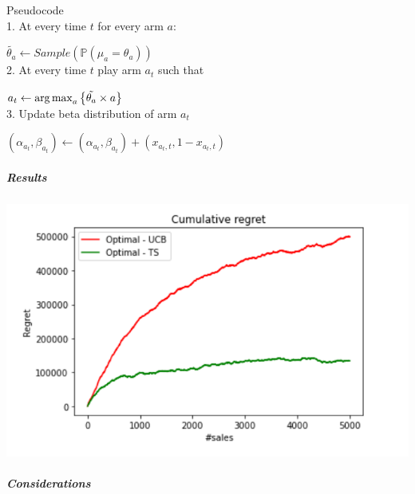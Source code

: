 Pseudocode\\

1. At every time $t$ for every arm $a$:

$\tilde{\theta_{a}} \leftarrow Sample(\mathbb P(\mu_{a}=\theta_{a}))$ \\

2. At every time $t$ play arm $a_{t}$ such that 

$a_{t} \leftarrow \operatorname{arg\,max}_a \left\{ \tilde{\theta_{a}} \times a \right\} $ \\

3.  Update beta distribution of arm $a_{t}$

$(\alpha_{a_{t}}, \beta_{a_{t}}) \leftarrow (\alpha_{a_{t}}, \beta_{a_{t}}) + (x_{a_{t},t}, 1 - x_{a_{t},t})$


\subparagraph*{Results}
\begin{center}
	\includegraphics[scale=1]{Images/n3}
\end{center}
\subparagraph*{Considerations}